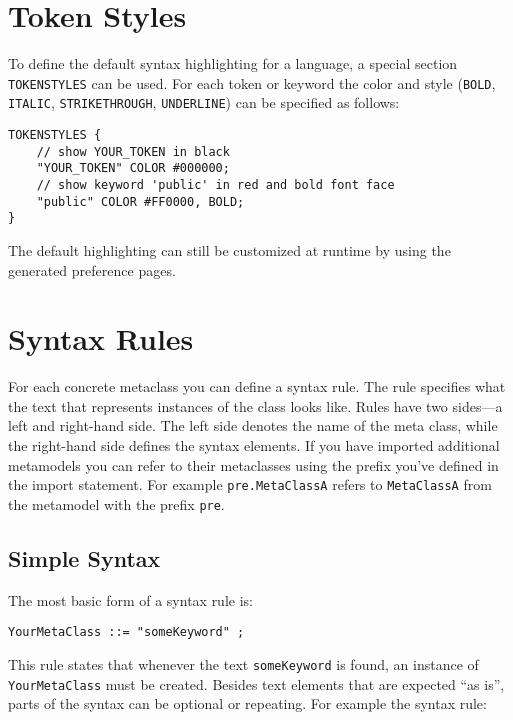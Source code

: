\section{Token Styles}

To define the default syntax highlighting for a language, a special section
\texttt{TOKENSTYLES} can be used. For each token or keyword the color and
style (\texttt{BOLD}, \texttt{ITALIC}, \texttt{STRIKETHROUGH},
\texttt{UNDERLINE}) can be specified as follows:

\begin{lstlisting}
TOKENSTYLES {
    // show YOUR_TOKEN in black
    "YOUR_TOKEN" COLOR #000000;
    // show keyword 'public' in red and bold font face
    "public" COLOR #FF0000, BOLD;
}
\end{lstlisting}

The default highlighting can still be customized at runtime by
using the generated preference pages.

\section{Syntax Rules}

For each concrete metaclass you can define a syntax rule. The rule specifies
what the text that represents instances of the class looks like. Rules have two
sides---a left and right-hand side. The left side denotes the name of the meta
class, while the right-hand side defines the syntax elements. If you have 
imported additional metamodels you can refer to their metaclasses using the 
prefix you've defined in the import statement. For example \texttt{pre.MetaClassA} refers to 
\texttt{MetaClassA} from the metamodel with the prefix \texttt{pre}.
 
\subsection{Simple Syntax}

The most basic form of a syntax rule is:

\begin{lstlisting}
YourMetaClass ::= "someKeyword" ;
\end{lstlisting}

This rule states that whenever the text \texttt{someKeyword} is found, an
instance of \texttt{YourMetaClass} must be created. Besides text elements that are
expected ``as is'', parts of the syntax can be optional or repeating. For
example the syntax rule:


